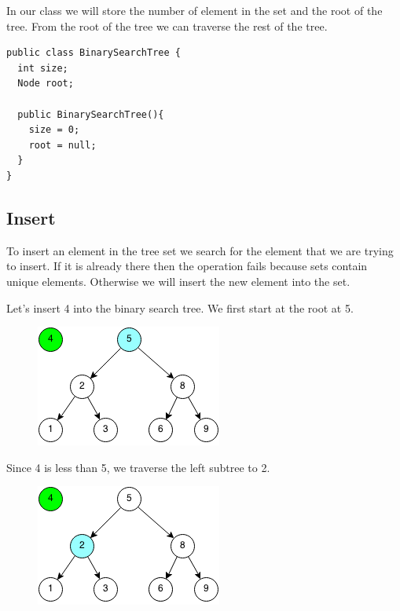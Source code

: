 \documentclass[11pt,oneside]{book}
\makeatletter
\def\maxwidth#1{\ifdim\Gin@nat@width>#1 #1\else\Gin@nat@width\fi}
\makeatother
\begin{document}
In our class we will store the number of element in the set and the root of the tree. From the root of the tree we can traverse the rest of the tree.

\begin{lstlisting}
public class BinarySearchTree {
  int size;
  Node root;
    
  public BinarySearchTree(){
    size = 0;
    root = null;
  }
}
\end{lstlisting}

\subsection{Insert}

To insert an element in the tree set we search for the element that we are trying to insert. If it is already there then the operation fails because sets contain unique elements. Otherwise we will insert the new element into the set.

Let's insert 4 into the binary search tree. We first start at the root at 5.

\vspace{5px}\begin{figure}[H]\centering
        \includegraphics[width=0.66\maxwidth{\textwidth}]{bstinsert.png}
        \end{figure}

Since 4 is less than 5, we traverse the left subtree to 2.

\vspace{5px}\begin{figure}[H]\centering
        \includegraphics[width=0.66\maxwidth{\textwidth}]{bstinsert2.png}
        \end{figure}
\end{document}
